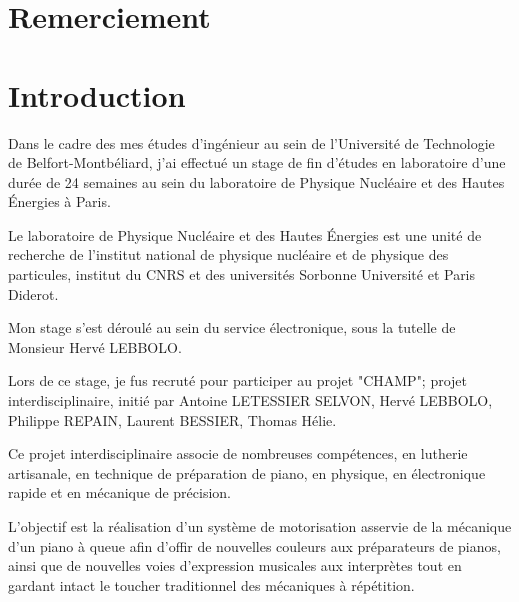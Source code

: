 \documentclass[french,a4paper,12pt]{report}
\begin{document}
  \chapter{Remerciement}
%  
%  
%  
  
 \chapter{Introduction}

Dans le cadre des mes études d'ingénieur au sein de l'Université de Technologie de Belfort-Montbéliard, j'ai effectué un stage de fin d'études en laboratoire d'une durée de 24 semaines au sein du laboratoire de Physique Nucléaire et des Hautes Énergies à Paris.

Le laboratoire de Physique Nucléaire et des Hautes Énergies est une unité de recherche de l'institut national de  physique nucléaire et de physique des particules, institut du CNRS et des universités Sorbonne Université et Paris Diderot.

Mon stage s'est déroulé au sein du service électronique, sous la tutelle de Monsieur Hervé LEBBOLO.

Lors de ce stage, je fus recruté pour participer au projet "CHAMP"; projet interdisciplinaire, initié par Antoine LETESSIER SELVON, Hervé LEBBOLO, Philippe REPAIN, Laurent BESSIER, Thomas Hélie.

Ce projet interdisciplinaire associe de nombreuses compétences, en lutherie artisanale, en technique de préparation de piano, en physique, en électronique rapide et en mécanique de précision.

L'objectif est la réalisation d'un système de motorisation asservie de la mécanique d'un piano à queue afin d'offir de nouvelles couleurs aux préparateurs de pianos, ainsi que de nouvelles voies d'expression musicales aux interprètes tout en gardant intact le toucher traditionnel des mécaniques à répétition.
\end{document}
